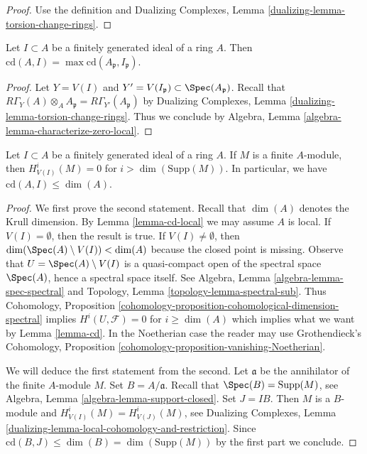 \begin{proof}
Use the definition and
Dualizing Complexes, Lemma \ref{dualizing-lemma-torsion-change-rings}.
\end{proof}

\begin{lemma}
\label{lemma-cd-local}
Let $I \subset A$ be a finitely generated ideal of a ring $A$.
Then $\text{cd}(A, I) = \max \text{cd}(A_\mathfrak p, I_\mathfrak p)$.
\end{lemma}

\begin{proof}
Let $Y = V(I)$ and $Y' = V(I_\mathfrak p) \subset \Spec(A_\mathfrak p)$.
Recall that
$R\Gamma_Y(A) \otimes_A A_\mathfrak p = R\Gamma_{Y'}(A_\mathfrak p)$
by Dualizing Complexes, Lemma \ref{dualizing-lemma-torsion-change-rings}.
Thus we conclude by Algebra, Lemma \ref{algebra-lemma-characterize-zero-local}.
\end{proof}

\begin{lemma}
\label{lemma-cd-dimension}
Let $I \subset A$ be a finitely generated ideal of a ring $A$.
If $M$ is a finite $A$-module, then
$H^i_{V(I)}(M) = 0$ for $i > \dim(\text{Supp}(M))$.
In particular, we have $\text{cd}(A, I) \leq \dim(A)$.
\end{lemma}

\begin{proof}
We first prove the second statement.
Recall that $\dim(A)$ denotes the Krull dimension. By
Lemma \ref{lemma-cd-local} we may assume $A$ is local.
If $V(I) = \emptyset$, then the result is true.
If $V(I) \not = \emptyset$, then
$\dim(\Spec(A) \setminus V(I)) < \dim(A)$ because
the closed point is missing. Observe that
$U = \Spec(A) \setminus V(I)$ is a quasi-compact
open of the spectral space $\Spec(A)$, hence a spectral space itself.
See Algebra, Lemma \ref{algebra-lemma-spec-spectral} and
Topology, Lemma \ref{topology-lemma-spectral-sub}.
Thus Cohomology, Proposition
\ref{cohomology-proposition-cohomological-dimension-spectral}
implies $H^i(U, \mathcal{F}) = 0$ for $i \geq \dim(A)$
which implies what we want by Lemma \ref{lemma-cd}.
In the Noetherian case the reader may use
Grothendieck's Cohomology, Proposition
\ref{cohomology-proposition-vanishing-Noetherian}.

\medskip\noindent
We will deduce the first statement from the second.
Let $\mathfrak a$ be the annihilator of the finite $A$-module $M$.
Set $B = A/\mathfrak a$. Recall that $\Spec(B) = \text{Supp}(M)$, see
Algebra, Lemma \ref{algebra-lemma-support-closed}.
Set $J = IB$. Then $M$ is a $B$-module
and $H^i_{V(I)}(M) = H^i_{V(J)}(M)$, see
Dualizing Complexes, Lemma
\ref{dualizing-lemma-local-cohomology-and-restriction}.
Since $\text{cd}(B, J) \leq \dim(B) = \dim(\text{Supp}(M))$
by the first part we conclude.
\end{proof}

